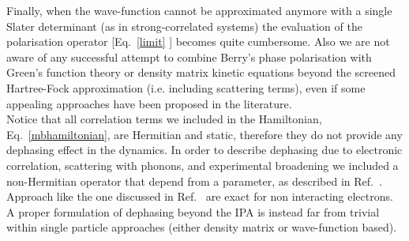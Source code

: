 Finally, when the wave-function cannot be approximated anymore with a single Slater determinant (as in strong-correlated systems) the evaluation of the polarisation operator [Eq.~\ref{limit} ] becomes quite cumbersome.\cite{stella} Also we are not aware of any successful attempt to combine Berry's phase polarisation with Green's function theory or density matrix kinetic equations beyond the screened Hartree-Fock approximation (i.e. including scattering terms), even if some appealing approaches have been proposed in the literature\cite{restagw,PhysRevB.84.205137,doi:10.7566/JPSJ.83.033708,nourafkan2013electric}.\\
Notice that all correlation terms we included in the Hamiltonian, Eq.~\ref{mbhamiltonian}, are Hermitian and static, therefore they do not provide any dephasing effect in the dynamics. In order to describe dephasing due to electronic correlation, scattering with phonons, and experimental broadening we included a non-Hermitian operator that depend from a parameter, as described in Ref.~.
Approach like the one discussed in Ref.~ are exact for non interacting electrons. A proper formulation of dephasing beyond the IPA is instead far from trivial within single particle approaches (either density matrix or wave-function based).\cite{sangalli2021excitons}

